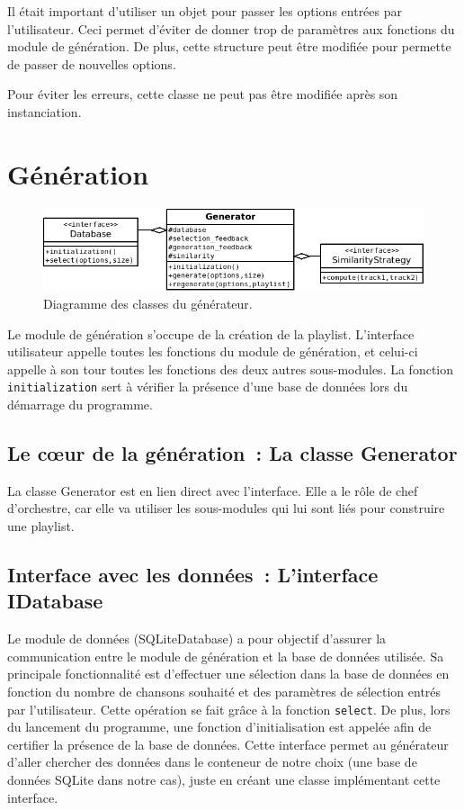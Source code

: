 Il était important d'utiliser un objet pour passer les options entrées par
l'utilisateur. Ceci permet d’éviter de donner trop de paramètres aux fonctions
du module de génération. De plus, cette structure peut être modifiée pour
permette de passer de nouvelles options.

Pour éviter les erreurs, cette classe ne peut pas être modifiée après son
instanciation.

\section{Génération}
\label{archi:generation}

\begin{figure}[H]
\includegraphics[width=\textwidth]{data/archi/generator.png}
\caption{Diagramme des classes du générateur.}
\end{figure}

Le module de génération s'occupe de la création de la playlist. 
L'interface utilisateur appelle toutes les fonctions du module 
de génération, et celui-ci appelle à son tour toutes les fonctions des deux 
autres sous-modules. La fonction \texttt{initialization} sert à vérifier la 
présence d'une base de données lors du démarrage du programme. 

\subsection{Le cœur de la génération~: La classe Generator}
\label{archi:generation:generator}

La classe Generator est en lien direct avec l’interface. Elle a le rôle de chef
d'orchestre, car elle va utiliser les sous-modules qui lui sont liés pour
construire une playlist.

\subsection{Interface avec les données~: L'interface IDatabase}
\label{archi:generation:database}

Le module de données (SQLiteDatabase) a pour objectif d'assurer la 
communication entre le module de génération et la base de données utilisée. 
Sa principale fonctionnalité est d'effectuer une sélection dans la base de 
données en fonction du nombre de chansons souhaité et des paramètres de 
sélection entrés par l'utilisateur. Cette opération se fait grâce à la 
fonction \texttt{select}. De plus, lors du lancement du programme, une 
fonction d'initialisation est appelée afin de certifier la présence de la 
base de données.
Cette interface permet au générateur d'aller chercher des données dans le
conteneur de notre choix (une base de données SQLite dans notre cas), juste
en créant une classe implémentant cette interface.

